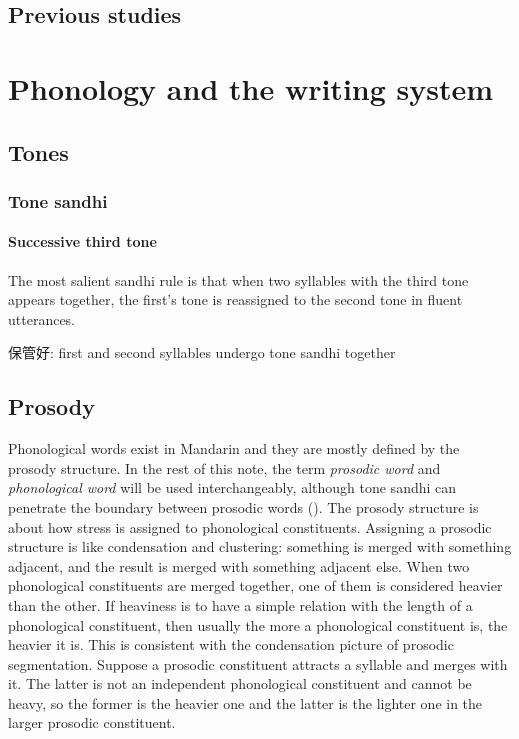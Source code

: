\documentclass[UTF8, a4paper, oneside, scheme=plain, 12pt]{ctexrep}
\newcommand*{\term}[1]{\emph{#1}}
\begin{document}
\section{Previous studies}

\chapter{Phonology and the writing system}

\section{Tones}

\subsection{Tone sandhi}\label{sec:phonology.tone-sandhi}

\subsubsection{Successive third tone}\label{sec:phonology.tone-sandhi.third}

The most salient sandhi rule is that 
when two syllables with the third tone appears together, 
the first's tone is reassigned to the second tone in 
fluent utterances. 

保管好: first and second syllables undergo tone sandhi together 

\section{Prosody}\label{sec:prosody-structure}

Phonological words exist in Mandarin 
and they are mostly defined by the prosody structure.
In the rest of this note,
the term \term{prosodic word} and \term{phonological word}
will be used interchangeably, 
although tone sandhi can penetrate 
the boundary between prosodic words
().
The prosody structure is about how stress is assigned to phonological constituents.
Assigning a prosodic structure is like condensation and clustering:
something is merged with something adjacent,
and the result is merged with something adjacent else.
When two phonological constituents are merged together,
one of them is considered heavier than the other.
If heaviness is to have a simple relation with the length of a phonological constituent,
then usually the more a phonological constituent is,
the heavier it is.
This is consistent with the condensation picture of prosodic segmentation.
Suppose a prosodic constituent attracts a syllable and merges with it.
The latter is not an independent phonological constituent
and cannot be heavy,
so the former is the heavier one and the latter is the lighter one in the larger prosodic constituent.
\end{document}
